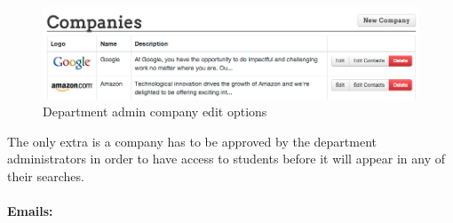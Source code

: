     \begin{figure}[H]\centering
    \includegraphics[scale=0.5]{images/user_experiences/admin/admin_company_edit_options}
    \caption{Department admin company edit options}
    \end{figure}

    The only extra is a company has to be approved by the department administrators in order to have access to students before it will appear in any of their searches.




  \paragraph{Emails:}
